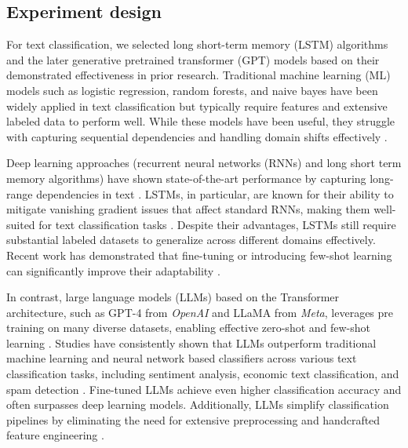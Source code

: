 \subsection{Experiment design}
%
%



For text classification, we selected long short-term memory (LSTM) algorithms and the later generative pretrained transformer (GPT) models based on their demonstrated effectiveness in prior research. Traditional machine learning (ML) models such as logistic regression, random forests, and naive bayes have been widely applied in text classification but typically require features and extensive labeled data to perform well. While these models have been useful, they struggle with capturing sequential dependencies and handling domain shifts effectively \cite{sarker2021machine}.

Deep learning approaches (recurrent neural networks (RNNs) and long short term memory algorithms) have shown state-of-the-art performance by capturing long-range dependencies in text \cite{sutskever2014sequence}. LSTMs, in particular, are known for their ability to mitigate vanishing gradient issues that affect standard RNNs, making them well-suited for text classification tasks \cite{hochreiter1997long}. Despite their advantages, LSTMs still require substantial labeled datasets to generalize across different domains effectively. Recent work has demonstrated that fine-tuning or introducing few-shot learning can significantly improve their adaptability \cite{jamshidi2024effective}.

In contrast, large language models (LLMs) based on the Transformer architecture, such as GPT-4 from \textit{OpenAI} and LLaMA from \textit{Meta}, leverages pre training on many diverse datasets, enabling effective zero-shot and few-shot learning \cite{brown2020language, touvron2023llama}. Studies have consistently shown that LLMs outperform traditional machine learning and neural network based classifiers across various text classification tasks, including sentiment analysis, economic text classification, and spam detection \cite{moller2024parrot, betianu2024dallmi}. Fine-tuned LLMs achieve even higher classification accuracy and often surpasses deep learning models. Additionally, LLMs simplify classification pipelines by eliminating the need for extensive preprocessing and handcrafted feature engineering \cite{oh2024language}.

